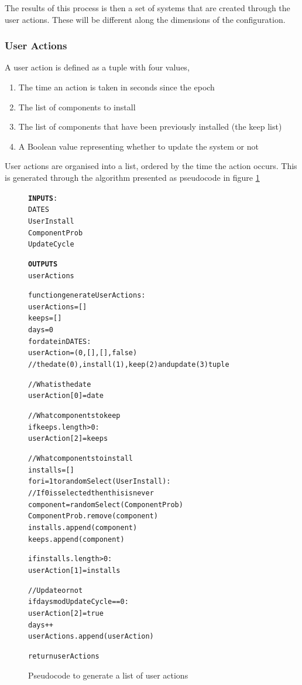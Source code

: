 The results of this process is then a set of systems that are created through the user actions.
These will be different along the dimensions of the configuration.

\subsubsection{User Actions}
A user action is defined as a tuple with four values,
\begin{enumerate}
  \item The time an action is taken in seconds since the epoch
  \item The list of components to install
  \item The list of components that have been previously installed (the keep list)
  \item A Boolean value representing whether to update the system or not
\end{enumerate}

User actions are organised into a list, ordered by the time the action occurs.
This is generated through the algorithm presented as pseudocode in figure \ref{generateuser}

\begin{figure}[htp]
\begin{center}
\begin{alltt}
\textbf{INPUTS}:
DATES
UserInstall
ComponentProb
UpdateCycle

\textbf{OUTPUTS}
userActions

function generateUserActions: 
    userActions = []
    keeps = []
    days = 0
    for date in DATES:
        userAction = (0, [], [], false) 
        //the date(0), install(1), keep(2) and update(3) tuple
        
        //What is the date
        userAction[0] = date
        
        //What components to keep
        if keeps.length > 0:
            userAction[2] = keeps 
            
        //What components to install
        installs = []
        for i = 1 to randomSelect(UserInstall):
            //If 0 is selected then this is never
            component = randomSelect(ComponentProb)
            ComponentProb.remove(component)
            installs.append(component)
            keeps.append(component)
            
        if installs.length > 0:
            userAction[1] = installs 
        
        //Update or not
        if days mod UpdateCycle == 0:
            userAction[2] = true
        days++
        userActions.append(userAction)
        
    return userActions
\end{alltt}
\caption[generateUser Pseudocode]{Pseudocode to generate a list of user actions}
\label{generateuser}
\end{center}
\end{figure}



